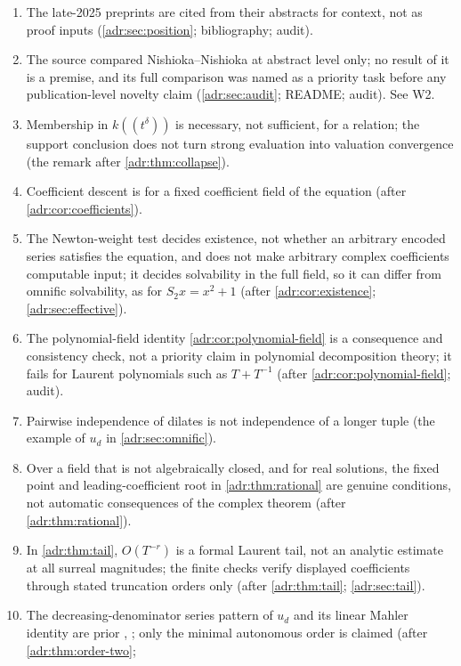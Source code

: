 \documentclass[11pt,letterpaper]{article}
\numberwithin{equation}{section}
\theoremstyle{definition}
\theoremstyle{remark}
\begin{document}
\begin{enumerate}[label=S\arabic*.,leftmargin=2.6em,itemsep=2pt]
of a primary source (\cref{adr:sec:position}; audit).
\item The late-2025 preprints \cite{FP,FRPurity} are cited from their
abstracts for context, not as proof inputs (\cref{adr:sec:position};
bibliography; audit).
\item The source compared Nishioka--Nishioka \cite{NN} at abstract level
only; no result of it is a premise, and its full comparison was named as a
priority task before any publication-level novelty claim
(\cref{adr:sec:audit}; README; audit). See W2.
\item Membership in $k((t^\delta))$ is necessary, not sufficient, for a
relation; the support conclusion does not turn strong evaluation into
valuation convergence (the remark after \cref{adr:thm:collapse}).
\item Coefficient descent is for a fixed coefficient field of the equation
(after \cref{adr:cor:coefficients}).
\item The Newton-weight test decides existence, not whether an arbitrary
encoded series satisfies the equation, and does not make arbitrary complex
coefficients computable input; it decides solvability in the full field,
so it can differ from omnific solvability, as for $S_2x=x^2+1$ (after
\cref{adr:cor:existence}; \cref{adr:sec:effective}).
\item The polynomial-field identity \cref{adr:cor:polynomial-field} is a
consequence and consistency check, not a priority claim in polynomial
decomposition theory; it fails for Laurent polynomials such as $T+T^{-1}$
(after \cref{adr:cor:polynomial-field}; audit).
\item Pairwise independence of dilates is not independence of a longer
tuple (the example of $u_d$ in \cref{adr:sec:omnific}).
\item Over a field that is not algebraically closed, and for real
solutions, the fixed point and leading-coefficient root in
\cref{adr:thm:rational} are genuine conditions, not automatic consequences
of the complex theorem (after \cref{adr:thm:rational}).
\item In \cref{adr:thm:tail}, $O(T^{-r})$ is a formal Laurent tail, not an
analytic estimate at all surreal magnitudes; the finite checks verify
displayed coefficients through stated truncation orders only (after
\cref{adr:thm:tail}; \cref{adr:sec:tail}).
\item The decreasing-denominator series pattern of $u_d$ and its linear
Mahler identity are prior \cite[Remark~2.18]{CDDM}, \cite{GG}; only the
minimal autonomous order is claimed (after \cref{adr:thm:order-two};

\end{enumerate}
\end{document}
